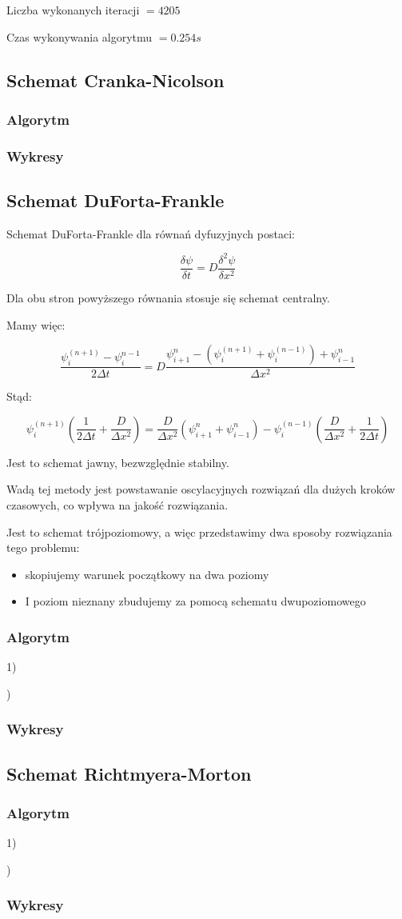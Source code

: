 Liczba wykonanych iteracji $ = 4205 $

Czas wykonywania algorytmu $ = 0.254 s$
\newpage

\newpage
\subsection{Schemat Cranka-Nicolson}
\newpage
\subsubsection{Algorytm}

\newpage
\subsubsection{Wykresy}
\newpage
\subsection{Schemat DuForta-Frankle}
Schemat DuForta-Frankle dla równań dyfuzyjnych postaci:

$$\dfrac{\delta \psi}{\delta t} = D\dfrac{\delta^2 \psi}{\delta x^2}$$

Dla obu stron powyższego równania stosuje się schemat centralny.

Mamy więc:

$$\dfrac{\psi^{(n+1)}_{i}-\psi^{n-1}_{i}}{2\Delta t}=D\dfrac{\psi^{n}_{i+1}- \left( \psi^{(n+1)}_{i} + \psi^{(n-1)}_{i} \right)+\psi^n_{i-1}}{\Delta x^2}$$

Stąd:

$$\psi^{(n+1)}_{i} \left(\dfrac{1}{2 \Delta t} + \dfrac{D}{\Delta x^2}\right)= \dfrac{D}{\Delta x^2} \left( \psi^{n}_{i+1} + \psi^{n}_{i-1} \right) - \psi^{(n-1)}_{i} \left( \dfrac{D}{\Delta x^2} + \dfrac{1}{2\Delta t} \right) $$

Jest to schemat jawny, bezwzględnie stabilny. 

Wadą tej metody jest powstawanie oscylacyjnych rozwiązań dla dużych kroków czasowych, co wpływa na jakość rozwiązania.

Jest to schemat trójpoziomowy, a więc przedstawimy dwa sposoby rozwiązania tego problemu:
\begin{itemize}
	\item skopiujemy warunek początkowy na dwa poziomy
	\item I poziom nieznany zbudujemy za pomocą schematu dwupoziomowego
\end{itemize}

\newpage
\subsubsection{Algorytm}
1)

)

\newpage
\subsubsection{Wykresy}
\newpage
\subsection{Schemat Richtmyera-Morton}
\newpage
\subsubsection{Algorytm}
1)

)

\newpage
\subsubsection{Wykresy}
\newpage
